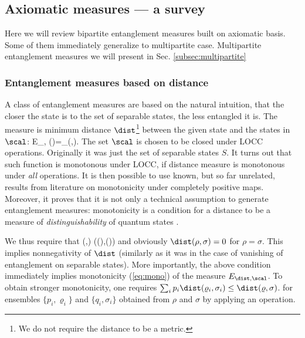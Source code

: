 \documentclass[rmp,12pt,preprint]{revtex4-2}
\begin{document}
\subsection{Axiomatic measures --- a survey}
\label{sec:measures-survey}
Here we will review bipartite entanglement measures built on axiomatic basis.
Some of them immediately generalize to multipartite case. Multipartite
entanglement measures we will present in Sec. \ref{subsec:multipartite}

\subsubsection{Entanglement measures based on distance}
\label{subsec-distance}

A class of entanglement measures \cite{VPRK1997,PlenioVedral1998} are based on the natural
intuition, that the closer the
state is to the set of separable states, the less entangled it is. The measure is
minimum distance $\dist$\footnote{We do not require the distance to  be a metric.} between the given state and the states in $\scal$:
\be
E_{\dist, \scal}(\varrho)=\inf_{\sigma\in \scal}\dist(\varrho,\sigma).
\label{eq-distance-measure}
\ee
The set $\scal$ is chosen to be closed under LOCC operations.
Originally it was just the set of separable states $S$.
It turns out that such function is monotonous under LOCC, if
distance measure is monotonous under {\it all} operations. It
is then possible to use known, but so far unrelated, results from literature
on monotonicity under completely positive maps. Moreover, it proves that it is
not only a technical assumption to generate entanglement measures:
monotonicity is a condition for a distance to be  a measure
of {\it distinguishability} of quantum states \cite{Fuchs-Graaf,VedralPJK1997-stat}.

We thus require that \be \dist(\rho,\sigma)\geq
\dist(\Lambda(\rho),\Lambda(\sigma)) \label{eq-distance-monotone}
\ee and obviously $\dist(\rho,\sigma)=0$ for $\rho=\sigma$. This
implies nonnegativity of $\dist$ (similarly as it was in the case of
vanishing of entanglement on separable states). More
importantly, the above condition immediately implies monotonicity
(\ref{eq:mono}) of the measure $E_{\dist,\scal}$. To obtain stronger
monotonicity, one requires $\sum_ip_i\dist(\varrho_i,\sigma_i)\leq
\dist(\varrho,\sigma)$. for ensembles $\{p_i,\varrho_i\}$ and
$\{q_i,\sigma_i\}$ obtained from $\rho$ and $\sigma$ by applying an
operation.
\end{document}
